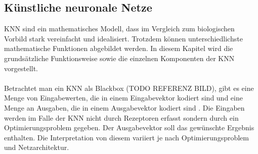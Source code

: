 \subsection{Künstliche neuronale Netze}
\ac{KNN} sind ein mathematisches Modell, dass im Vergleich zum biologischen Vorbild stark vereinfacht und idealisiert. Trotzdem können unterschiedlichste mathematische Funktionen abgebildet werden. In diesem Kapitel wird die grundsätzliche Funktionsweise sowie die einzelnen Komponenten der \ac{KNN} vorgestellt. \\\\
Betrachtet man ein \ac{KNN} als Blackbox (TODO REFERENZ BILD), gibt es eine Menge von Eingabewerten, die in einem Eingabevektor kodiert sind und eine Menge an Ausgaben, die in einem Ausgabevektor kodiert sind \cite{scherer2013neuronale}. Die Eingaben werden im Falle der \ac{KNN} nicht durch Rezeptoren erfasst sondern durch ein Optimierungsproblem gegeben. Der Ausgabevektor soll das gewünschte Ergebnis enthalten. Die Interpretation von diesem variiert je nach Optimierungsproblem und Netzarchitektur. \\

